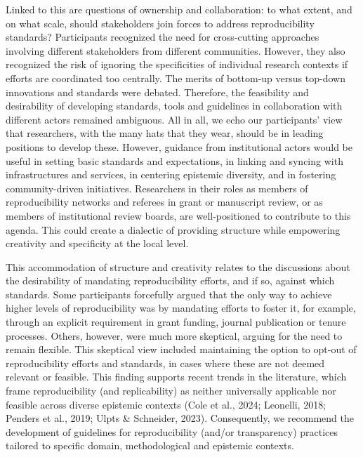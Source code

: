 \documentclass[authordate, meta]{jote-new-article}
\begin{document}
	Linked to this are questions of ownership and collaboration: to what extent, and on what scale, should stakeholders join forces to address reproducibility standards? Participants recognized the need for cross-cutting approaches involving different stakeholders from different communities. However, they also recognized the risk of ignoring the specificities of individual research contexts if efforts are coordinated too centrally. The merits of bottom-up versus top-down innovations and standards were debated. Therefore, the feasibility and desirability of developing standards, tools and guidelines in collaboration with different actors remained ambiguous. All in all, we echo our participants' view that researchers, with the many hats that they wear, should be in leading positions to develop these. However, guidance from institutional actors would be useful in setting basic standards and expectations, in linking and syncing with infrastructures and services, in centering epistemic diversity, and in fostering community-driven initiatives. Researchers in their roles as members of reproducibility networks and referees in grant or manuscript review, or as members of institutional review boards, are well-positioned to contribute to this agenda. This could create a dialectic of providing structure while empowering creativity and specificity at the local level.







	This accommodation of structure and creativity relates to the discussions about the desirability of mandating reproducibility efforts, and if so, against which standards. Some participants forcefully argued that the only way to achieve higher levels of reproducibility was by mandating efforts to foster it, for example, through an explicit requirement in grant funding, journal publication or tenure processes. Others, however, were much more skeptical, arguing for the need to remain flexible. This skeptical view included maintaining the option to opt-out of reproducibility efforts and standards, in cases where these are not deemed relevant or feasible. This finding supports recent trends in the literature, which frame reproducibility (and replicability) as neither universally applicable nor feasible across diverse epistemic contexts (Cole et al., 2024; Leonelli, 2018; Penders et al., 2019; Ulpts \& Schneider, 2023). Consequently, we recommend the development of guidelines for reproducibility (and/or transparency) practices tailored to specific domain, methodological and epistemic contexts.
\end{document}
